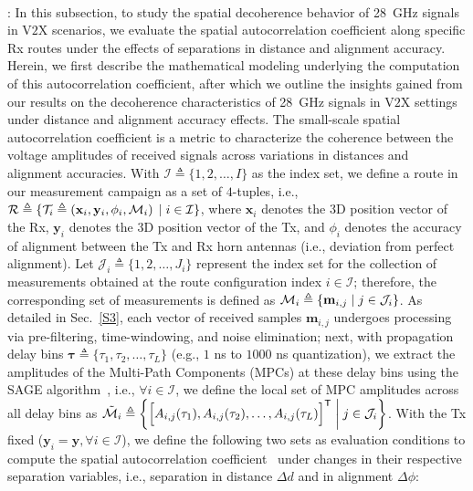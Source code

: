\documentclass[10pt, twocolumn]{IEEEtran}
\newcommand{\suchthat}{\;\ifnum\currentgrouptype=16 \middle\fi|\;}
\begin{document}
{\\: In this subsection, to study the spatial decoherence behavior of \SI{28}{\giga\hertz} signals in V$2$X scenarios, we evaluate the spatial autocorrelation coefficient along specific Rx routes under the effects of separations in distance and alignment accuracy. Herein, we first describe the mathematical modeling underlying the computation of this autocorrelation coefficient, after which we outline the insights gained from our results on the decoherence characteristics of \SI{28}{\giga\hertz} signals in V$2$X settings under distance and alignment accuracy effects. The small-scale spatial autocorrelation coefficient is a metric to characterize the coherence between the voltage amplitudes of received signals across variations in distances and alignment accuracies. With $\mathcal{I} \triangleq \{1,2,{\dots},I\}$ as the index set, we define a route in our measurement campaign as a set of $4$-tuples, i.e., $\mathcal{R} \triangleq \{\mathcal{T}_{i} \triangleq \left(\mathbf{x}_{i}, \mathbf{y}_{i}, \phi_{i}, \mathcal{M}_{i}\right) \suchthat i \in \mathcal{I}\}$, where $\mathbf{x}_{i}$ denotes the $3$D position vector of the Rx, $\mathbf{y}_{i}$ denotes the $3$D position vector of the Tx, and $\phi_{i}$ denotes the accuracy of alignment between the Tx and Rx horn antennas (i.e., deviation from perfect alignment). Let $\mathcal{J}_{i} \triangleq \{1,2,{\dots},J_{i}\}$ represent the index set for the collection of measurements obtained at the route configuration index $i \in \mathcal{I}$; therefore, the corresponding set of measurements is defined as $\mathcal{M}_{i} \triangleq \{\mathbf{m}_{i,j} \suchthat j \in \mathcal{J}_{i}\}$. As detailed in Sec.~\ref{S3}, each vector of received samples $\mathbf{m}_{i,j}$ undergoes processing via pre-filtering, time-windowing, and noise elimination; next, with propagation delay bins $\boldsymbol{\tau} \triangleq \{\tau_{1},\tau_{2},{\dots},\tau_{L}\}$ (e.g., $1$ ns to $1000$ ns quantization), we extract the amplitudes of the Multi-Path Components (MPCs) at these delay bins using the SAGE algorithm~\cite{SAGE}, i.e., $\forall i \in \mathcal{I}$, we define the local set of MPC amplitudes across all delay bins as $\tilde{\mathcal{M}}_{i} \triangleq \left\{\Big[A_{i,j}(\tau_{1}), A_{i,j}(\tau_{2}), \dots, A_{i,j}(\tau_{L})\Big]^{\mathsf{T}} \suchthat j \in \mathcal{J}_{i}\right\}$.
\vspace{1mm}
With the Tx fixed ($\mathbf{y}_{i} = \mathbf{y}, \forall i \in \mathcal{I}$), we define the following two sets as evaluation conditions to compute the spatial autocorrelation coefficient~\cite{MacCartneySpatialStatistics} under changes in their respective separation variables, i.e., separation in distance $\Delta d$ and in alignment $\Delta \phi$:
}
\end{document}

